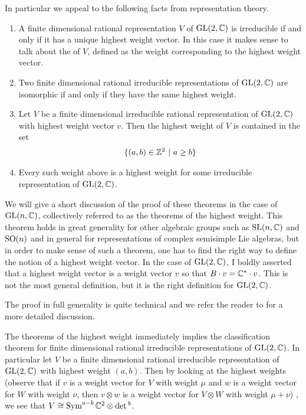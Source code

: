 \documentclass[12pt]{article}
\begin{document}
\hfill 

In particular we appeal to the following facts from representation theory.
\begin{theorem}\label{thm:hw}
    \begin{enumerate}
        \item A finite dimensional rational representation $V$ of $\operatorname{GL}(2,\mathbb{C})$ is irreducible if and only if it has a unique highest weight vector.
        In this case it makes sense to talk about the  of $V$, defined as the weight corresponding to the highest weight vector.
        \item Two finite dimensional rational irreducible representations of $\operatorname{GL}(2,\mathbb{C})$ are isomorphic if and only if they have the same highest weight.
        \item Let $V$ be a finite dimensional irreducible rational representation of $\operatorname{GL}(2,\mathbb{C})$ with highest weight vector $v$. Then the highest weight of $V$ is contained in the set \begin{align*}
            \{(a,b)\in \mathbb{Z}^2 \ \vert \  a\geq b \}
        \end{align*}
        \item Every such weight above is a highest weight for some irreducible representation of $\operatorname{GL}(2,\mathbb{C})$.
    \end{enumerate}
\end{theorem}

We will give a short discussion of the proof of these theorems in the case of $\operatorname{GL}(n,\mathbb{C})$, collectively referred to as the theorems of the highest weight.
This theorem holds in great generality for other algebraic groups such as $\operatorname{SL}(n,\mathbb{C})$ and $\operatorname{SO}(n)$ and in general for representations of complex semisimple Lie algebras,
but in order to make sense of such a theorem, one has to find the right way to define the notion of a highest weight vector.
In the case of $\operatorname{GL}(2,\mathbb{C})$, I boldly asserted that a highest weight vector is a weight vector $v$
 so that $B\cdot v = \mathbb{C}^*\cdot v$. This is not the most general definition, but it is the
right definition for $\operatorname{GL}(2,\mathbb{C})$.

\hfill 

The proof in full generality is quite technical and we refer the reader to \cite{milne} for a more detailed discussion.

\hfill

The theorems of the highest weight immediately implies the classification theorem for finite dimensional rational irreducible representations of $\operatorname{GL}(2,\mathbb{C})$.
In particular let $V$ be a finite dimensional rational irreducible representation of $\operatorname{GL}(2,\mathbb{C})$ with highest weight $(a,b)$. Then
by looking at the highest weights (observe that if $v$ is a weight vector for $V$ with weight $\mu$ and 
$w$ is a weight vector for $W$ with weight $\nu$, then $v\otimes w$ is a weight vector for $V\otimes W$ with weight $\mu + \nu$)
, we see that $V \cong \operatorname{Sym}^{a-b}\mathbb{C}^2 \otimes \det{}^{b}$. 
\end{document}
